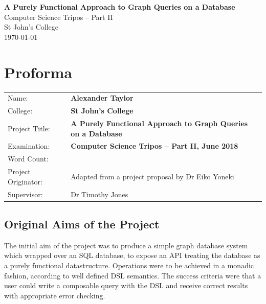\documentclass[12pt,a4paper,twoside,openright]{report}
\newcommand{\projectTitle}[0]{A Purely Functional Approach to Graph Queries on a Database}
\begin{document}


\pagestyle{empty}


\vspace*{60mm}
\begin{center}
\Huge
\textbf{\projectTitle} \\[5mm]
Computer Science Tripos -- Part II \\[5mm]
St John's College \\[5mm]
\today  %
\end{center}


\pagestyle{plain}

\chapter*{Proforma}

{\large
\begin{tabular}{p{5cm}p{10cm}}
Name:               & \bf Alexander Taylor                       \\
College:            & \bf St John's College                     \\
Project Title:      & \bf \projectTitle  \\
Examination:        & \bf Computer Science Tripos -- Part II, June 2018  \\
Word Count:         & \bf   \\
Project Originator: & Adapted from a project proposal by Dr Eiko Yoneki                    \\
Supervisor:         & Dr Timothy Jones                    \\ 
\end{tabular}
}

\section*{Original Aims of the Project}

The initial aim of the project was to produce a simple graph database system which wrapped over an SQL database, to expose an API treating the database as a purely functional datastructure. Operations were to be achieved in a monadic fashion, according to well defined DSL semantics. The success criteria were that a user could write a composable query with the DSL and receive correct results with appropriate error checking.
\end{document}
